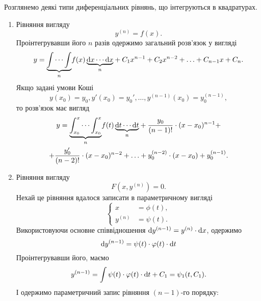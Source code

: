 Розглянемо деякі типи диференціальних рівнянь, що інтегруються в квадратурах.

\begin{enumerate}
\item Рівняння вигляду
\begin{equation*}
	y^{(n)} = f(x).
\end{equation*}
Проінтегрувавши його $n$ разів одержимо загальний розв’язок у вигляді
\begin{equation*}
	y = \underset{n}{\underbrace{\int \cdots \int}} f(x) \,\underset{n}{\underbrace{\mathop{}\!\mathrm{d} x \cdots \mathop{}\!\mathrm{d} x}} + C_1 x^{n-1} + C_2 x^{n-2} + \ldots + C_{n-1} x + C_n.
\end{equation*}
Якщо задані умови Коші
\begin{equation*}
	y(x_0) = y_0, y'(x_0) = y_0', \ldots, y^{(n - 1)} (x_0) = y_0^{(n-1)},
\end{equation*}
то розв’язок має вигляд
\begin{multline}
	y = \underset{n}{\underbrace{\int_{x_0}^x \cdots \int_{x_0}^x}} f(t) \, \underset{n}{\underbrace{\mathop{}\!\mathrm{d} t \cdots \mathop{}\!\mathrm{d} t}} + \frac{y_0}{(n-1)!} \cdot (x-x_0)^{n-1} + \\ 
	+ \frac{y_0'}{(n-2)!} \cdot (x-x_0)^{n-2} + \ldots + y_0^{(n-2)} \cdot (x-x_0) + y_0^{(n-1)}.
\end{multline}
\item Рівняння вигляду
\begin{equation*}
	F\left(x, y^{(n)}\right) = 0.
\end{equation*}
Нехай це рівняння вдалося записати в параметричному вигляді
\begin{equation*}
	\left\{
		\begin{aligned}
			x &= \phi(t), \\
			y^{(n)} &= \psi (t).
		\end{aligned}
	\right.
\end{equation*}
Використовуючи основне співвідношення $\mathop{}\!\mathrm{d} y^{(n-1)} = y^{(n)} \cdot \mathop{}\!\mathrm{d} x$, одержимо
\begin{equation*}
	\mathop{}\!\mathrm{d} y^{(n-1)} = \psi(t) \cdot \varphi(t) \cdot \mathop{}\!\mathrm{d} t
\end{equation*}
Проінтегрувавши його, маємо 
  \begin{equation*}
	y^{(n-1)} = \int \psi(t) \cdot \varphi(t) \cdot \mathop{}\!\mathrm{d} t + C_1 = \psi_1(t, C_1).
\end{equation*}
І одержимо параметричний запис рівняння $(n-1)$-го порядку:

\end{enumerate}
